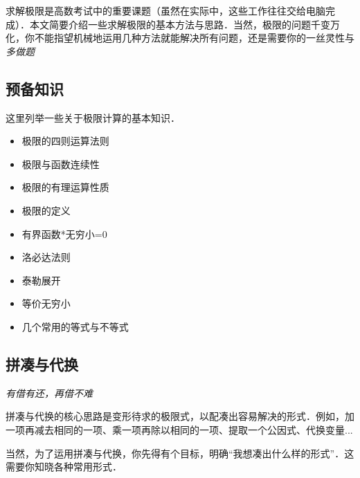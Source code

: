 
求解极限是高数考试中的重要课题（虽然在实际中，这些工作往往交给电脑完成）．本文简要介绍一些求解极限的基本方法与思路．当然，极限的问题千变万化，你不能指望机械地运用几种方法就能解决所有问题，还是需要你的一丝灵性与\textsl{多做题}

\subsection{预备知识}
这里列举一些关于极限计算的基本知识．
\begin{itemize}
\item 极限的四则运算法则
\item 极限与函数连续性
\item 极限的有理运算性质
\item 极限的定义
\item 有界函数*无穷小=0
\item 洛必达法则
\item 泰勒展开
\item 等价无穷小
\item 几个常用的等式与不等式
\end{itemize}

\subsection{拼凑与代换}
\textsl{有借有还，再借不难}

拼凑与代换的核心思路是变形待求的极限式，以配凑出容易解决的形式．例如，加一项再减去相同的一项、乘一项再除以相同的一项、提取一个公因式、代换变量...

当然，为了运用拼凑与代换，你先得有个目标，明确“我想凑出什么样的形式”．这需要你知晓各种常用形式．
